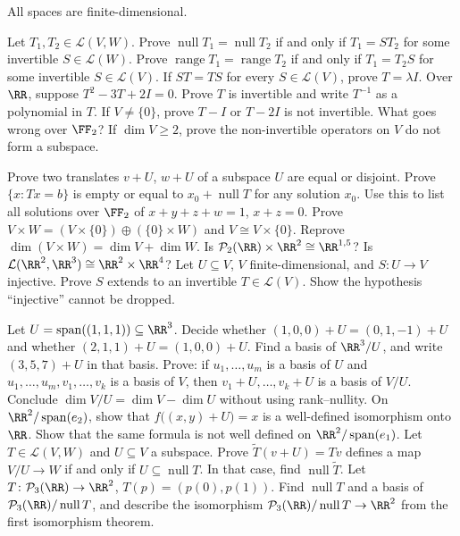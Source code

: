\documentclass[11pt]{scrartcl}
\DeclareMathOperator{\nul}{null}
\DeclareMathOperator{\range}{range}
\DeclareMathOperator{\spn}{span}
\newcommand{\LL}{\mathcal L}
\newcommand{\PP}{\mathcal P}
\begin{document}
\begin{problem}
  All spaces are finite-dimensional.
  \begin{enumerate}[(a)]
    \ii Let $T_1,T_2\in\LL(V,W)$.
    Prove $\nul T_1=\nul T_2$ if and only if $T_1=ST_2$ for some invertible $S\in\LL(W)$.
    \ii Prove $\range T_1=\range T_2$ if and only if $T_1=T_2S$ for some invertible $S\in\LL(V)$.
    \ii If $ST=TS$ for every $S\in\LL(V)$, prove $T=\lambda I$.
    \ii Over $\RR$, suppose $T^2-3T+2I=0$.
    Prove $T$ is invertible and write $T^{-1}$ as a polynomial in $T$.
    If $V\ne\{0\}$, prove $T-I$ or $T-2I$ is not invertible.
    What goes wrong over $\FF_2$?
    \ii If $\dim V\ge2$, prove the non-invertible operators on $V$ do not form a subspace.
  \end{enumerate}
\end{problem}

\begin{problem}
  \leavevmode
  \begin{enumerate}[(a)]
    \ii Prove two translates $v+U$, $w+U$ of a subspace $U$ are equal or disjoint.
    \ii Prove $\{x:Tx=b\}$ is empty or equal to $x_0+\nul T$ for any solution $x_0$.
    Use this to list all solutions over $\FF_2$ of $x+y+z+w=1$, $x+z=0$.
    \ii Prove $V\times W=(V\times\{0\})\oplus(\{0\}\times W)$ and $V\cong V\times\{0\}$.
    Reprove $\dim(V\times W)=\dim V+\dim W$.
    \ii Is $\PP_2(\RR)\times\RR^2\cong\RR^{1,5}$? Is $\LL(\RR^2,\RR^3)\cong\RR^2\times\RR^4$?
    \ii Let $U\subseteq V$, $V$ finite-dimensional, and $S\colon U\to V$ injective.
    Prove $S$ extends to an invertible $T\in\LL(V)$.
    Show the hypothesis ``injective'' cannot be dropped.
  \end{enumerate}
\end{problem}

\begin{problem}
  \leavevmode
  \begin{enumerate}[(a)]
    \ii Let $U=\spn((1,1,1))\subseteq\RR^3$.
    Decide whether $(1,0,0)+U=(0,1,-1)+U$ and whether $(2,1,1)+U=(1,0,0)+U$.
    Find a basis of $\RR^3/U$, and write $(3,5,7)+U$ in that basis.
    \ii Prove: if $u_1,\dots,u_m$ is a basis of $U$ and $u_1,\dots,u_m,v_1,\dots,v_k$ is a basis of $V$, then $v_1+U,\dots,v_k+U$ is a basis of $V/U$.
    Conclude $\dim V/U=\dim V-\dim U$ without using rank--nullity.
    \ii On $\RR^2/\spn(e_2)$, show that $f\big((x,y)+U\big)=x$ is a well-defined isomorphism onto $\RR$.
    Show that the same formula is not well defined on $\RR^2/\spn(e_1)$.
    \ii Let $T\in\LL(V,W)$ and $U\subseteq V$ a subspace.
    Prove $\tilde T(v+U)=Tv$ defines a map $V/U\to W$ if and only if $U\subseteq\nul T$.
    In that case, find $\nul\tilde T$.
    \ii Let $T\colon\PP_3(\RR)\to\RR^2$, $T(p)=(p(0),p(1))$.
    Find $\nul T$ and a basis of $\PP_3(\RR)/\nul T$, and describe the isomorphism $\PP_3(\RR)/\nul T\to\RR^2$ from the first isomorphism theorem.
  \end{enumerate}
\end{problem}
\end{document}
